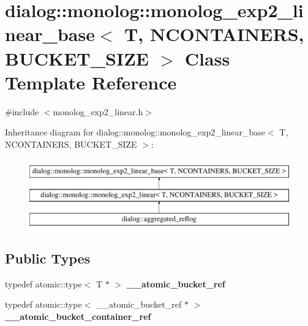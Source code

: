 \hypertarget{classdialog_1_1monolog_1_1monolog__exp2__linear__base}{}\section{dialog\+:\+:monolog\+:\+:monolog\+\_\+exp2\+\_\+linear\+\_\+base$<$ T, N\+C\+O\+N\+T\+A\+I\+N\+E\+RS, B\+U\+C\+K\+E\+T\+\_\+\+S\+I\+ZE $>$ Class Template Reference}
\label{classdialog_1_1monolog_1_1monolog__exp2__linear__base}


{\ttfamily \#include $<$monolog\+\_\+exp2\+\_\+linear.\+h$>$}

Inheritance diagram for dialog\+:\+:monolog\+:\+:monolog\+\_\+exp2\+\_\+linear\+\_\+base$<$ T, N\+C\+O\+N\+T\+A\+I\+N\+E\+RS, B\+U\+C\+K\+E\+T\+\_\+\+S\+I\+ZE $>$\+:\begin{figure}[H]
\begin{center}
\leavevmode
\includegraphics[height=3.000000cm]{classdialog_1_1monolog_1_1monolog__exp2__linear__base}
\end{center}
\end{figure}
\subsection*{Public Types}
\begin{DoxyCompactItemize}
\item 
\mbox{\label{classdialog_1_1monolog_1_1monolog__exp2__linear__base_a903e99e4a8ae7f24bff57366a5f110b2}} 
typedef atomic\+::type$<$ T $\ast$ $>$ {\bfseries \+\_\+\+\_\+atomic\+\_\+bucket\+\_\+ref}
\item 
\mbox{\label{classdialog_1_1monolog_1_1monolog__exp2__linear__base_ae0189ef8c9f918cec38c878f5399c358}} 
typedef atomic\+::type$<$ \+\_\+\+\_\+atomic\+\_\+bucket\+\_\+ref $\ast$ $>$ {\bfseries \+\_\+\+\_\+atomic\+\_\+bucket\+\_\+container\+\_\+ref}
\end{DoxyCompactItemize}
